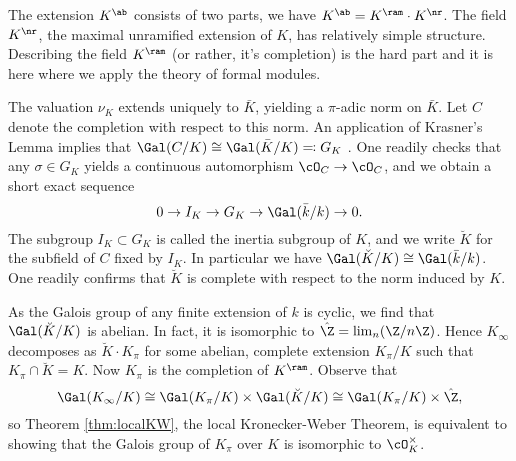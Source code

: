 \documentclass[../main.tex]{subfiles}
\begin{document}
The extension $K^\ab$ consists of two parts, we have 
$K^\ab = K^\ram \cdot K^\nr$. The field $K^\nr$, the maximal unramified extension
of $K$, has relatively simple structure. 
Describing the field $K^\ram$ (or rather, it's completion) is the hard part and
it is here where we apply the theory of formal modules.

The valuation $\nu_K$ extends uniquely to $\bar K$, yielding a
$\pi$-adic norm on $\bar K$. Let $C$ denote the completion with respect to this
norm. An application of Krasner's Lemma implies that $\Gal(C/K) \cong \Gal(\bar
K/K) \eqqcolon G_K$
. One readily checks that any $\sigma \in G_K$ yields a 
continuous automorphism $\cO_C \to \cO_C$, and we obtain a short exact sequence 
\begin{equation*}
  0 \to I_K \to G_K \to \Gal(\bar k /k) \to 0.
\end{equation*}
The subgroup $I_K \subset G_K$ is called the inertia subgroup of $K$,
and we write $\breve K$ for the subfield of $C$ fixed by $I_K$. In particular
we have $\Gal(\breve K /K) \cong \Gal(\bar k /k)$. One readily confirms that 
$\breve K$ is complete with respect to the norm induced by $K$. 

As the Galois group of any finite extension
of $k$ is cyclic, we find that $\Gal(\breve K/K)$ is abelian. In fact,
it is isomorphic to $\hat \Z = \lim_n (\Z/n\Z)$. Hence
$K_\infty$ decomposes as $\breve K \cdot K_\pi$ for some abelian, complete
extension $K_\pi/K$ such that $K_\pi \cap \breve K = K$. Now $K_\pi$ is the 
completion of $K^\ram$. Observe that
\begin{equation*}
  \Gal(K_\infty/K) \cong \Gal(K_\pi/K) \times \Gal(\breve K/K) \cong
  \Gal(K_\pi/K) \times \hat \Z,
\end{equation*}
so Theorem \ref{thm:localKW}, the local Kronecker-Weber Theorem, is 
equivalent to showing that the Galois group of $K_\pi$ over $K$ is 
isomorphic to $\cO_K^\times$.


\end{document}
